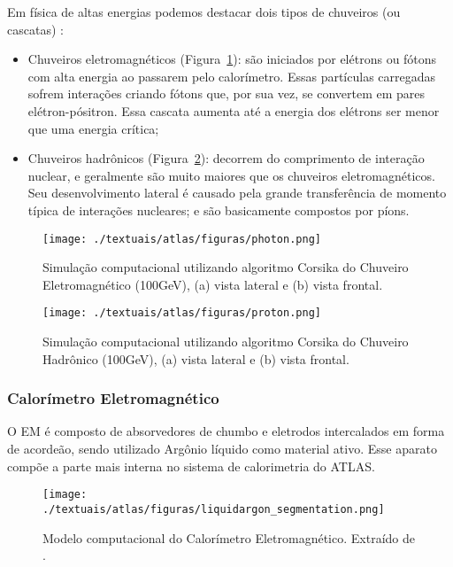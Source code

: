 Em física de altas energias podemos destacar dois tipos de chuveiros (ou cascatas) \cite{grupen2008particle}:

\begin{itemize}
\item Chuveiros eletromagnéticos (Figura~\ref{fig:2T10}): são iniciados por elétrons ou fótons com alta energia ao passarem pelo calorímetro. Essas partículas carregadas sofrem interações criando fótons que, por sua vez, se convertem em pares elétron-pósitron. Essa cascata aumenta até a energia dos elétrons ser menor que uma energia crítica;
\item Chuveiros hadrônicos (Figura~\ref{fig:2T11}): decorrem do comprimento de interação nuclear, e geralmente são muito maiores que os chuveiros eletromagnéticos. Seu desenvolvimento lateral é causado pela grande transferência de momento típica de interações nucleares; e são basicamente compostos por píons.
\end{itemize}

\begin{figure}[h!]
	\centering
	\texttt{[image: ./textuais/atlas/figuras/photon.png]}\\
	\caption{Simulação computacional utilizando algoritmo Corsika do Chuveiro Eletromagnético (100GeV), (a) vista lateral e (b) vista frontal.}
	\label{fig:2T10}
\end{figure}

\begin{figure}[h!]
	\centering
	\texttt{[image: ./textuais/atlas/figuras/proton.png]}\\
	\caption{Simulação computacional utilizando algoritmo Corsika do Chuveiro Hadrônico (100GeV), (a) vista lateral e (b) vista frontal.}
	\label{fig:2T11}
\end{figure}

\subsubsection{Calorímetro Eletromagnético}\label{subsec:cal_ele}

O \ac{EM} \cite{calorimeter2008construction} é composto de absorvedores de chumbo e eletrodos intercalados em forma de acordeão, sendo utilizado Argônio líquido como material ativo. Esse aparato compõe a parte mais interna no sistema de calorimetria do ATLAS.

\begin{figure}[h!]
	\centering
	\texttt{[image: ./textuais/atlas/figuras/liquidargon\_segmentation.png]}\\
	\caption{Modelo computacional do Calorímetro Eletromagnético. Extraído de \cite{francavilla2012atlas}.}
	\label{fig:2T12}
\end{figure}

